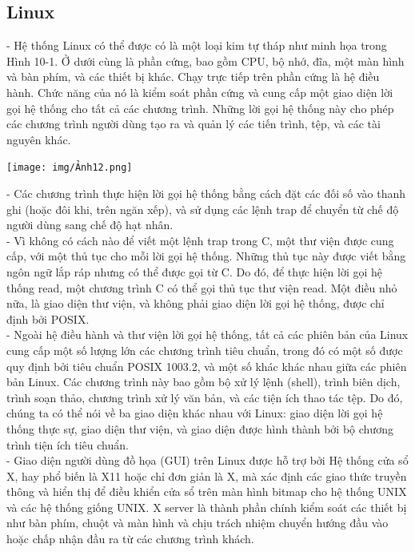\documentclass[12pt,a4paper]{article}
\begin{document}
\subsection{Linux}
- Hệ thống Linux có thể được có là một loại kim tự tháp như minh họa trong Hình 10-1. Ở dưới cùng là phần cứng, bao gồm CPU, bộ nhớ, đĩa, một màn hình và bàn phím, và các thiết bị khác. Chạy trực tiếp trên phần cứng là hệ điều hành. Chức năng của nó là kiểm soát phần cứng và cung cấp một giao diện lời gọi hệ thống cho tất cả các chương trình. Những lời gọi hệ thống này cho phép các chương trình người dùng tạo ra và quản lý các tiến trình, tệp, và các tài nguyên khác.
\begin{center}
	\texttt{[image: img/Ảnh12.png]}
\end{center}
- Các chương trình thực hiện lời gọi hệ thống bằng cách đặt các đối số vào thanh ghi (hoặc đôi khi, trên ngăn xếp), và sử dụng các lệnh trap để chuyển từ chế độ người dùng sang chế độ hạt nhân.\\

- Vì không có cách nào để viết một lệnh trap trong C, một thư viện được cung cấp, với một thủ tục cho mỗi lời gọi hệ thống. Những thủ tục này được viết bằng ngôn ngữ lắp ráp nhưng có thể được gọi từ C. Do đó, để thực hiện lời gọi hệ thống read, một chương trình C có thể gọi thủ tục thư viện read. Một điều nhỏ nữa, là giao diện thư viện, và không phải giao diện lời gọi hệ thống, được chỉ định bởi POSIX.\\

- Ngoài hệ điều hành và thư viện lời gọi hệ thống, tất cả các phiên bản của Linux cung cấp một số lượng lớn các chương trình tiêu chuẩn, trong đó có một số được quy định bởi tiêu chuẩn POSIX 1003.2, và một số khác khác nhau giữa các phiên bản Linux. Các chương trình này bao gồm bộ xử lý lệnh (shell), trình biên dịch, trình soạn thảo, chương trình xử lý văn bản, và các tiện ích thao tác tệp. Do đó, chúng ta có thể nói về ba giao diện khác nhau với Linux: giao diện lời gọi hệ thống thực sự, giao diện thư viện, và giao diện được hình thành bởi bộ chương trình tiện ích tiêu chuẩn.\\

- Giao diện người dùng đồ họa (GUI) trên Linux được hỗ trợ bởi Hệ thống cửa sổ X, hay phổ biến là X11 hoặc chỉ đơn giản là X, mà xác định các giao thức truyền thông và hiển thị để điều khiển cửa sổ trên màn hình bitmap cho hệ thống UNIX và các hệ thống giống UNIX. X server là thành phần chính kiểm soát các thiết bị như bàn phím, chuột và màn hình và chịu trách nhiệm chuyển hướng đầu vào hoặc chấp nhận đầu ra từ các chương trình khách.\\
\end{document}
